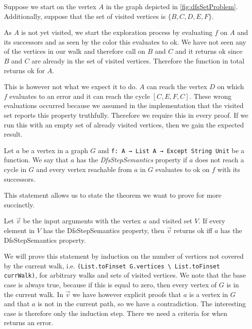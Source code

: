 \begin{example}
  Suppose we start \dfsstep on the vertex $A$ in the graph depicted in \cref{fig:dfsSetProblem}. Additionally, suppose that the set of visited vertices is $\{B,C,D,E,F\}$. 
  
  As $A$ is not yet visited, we start the exploration process by evaluating $f$ on $A$ and its successors and as seen by the color this evaluates to ok. We have not seen any of the vertices in our walk and therefore call \dfsstep on $B$ and $C$ and it returns ok since $B$ and $C$ are already in the set of visited vertices. Therefore the function in total returns ok for $A$.

  This is however not what we expect it to do. $A$ can reach the vertex $D$ on which $f$ evaluates to an error and it can reach the cycle $[C,E,F,C]$. These wrong evaluations occurred because we assumed in the implementation that the visited set reports this property truthfully. Therefore we require this in every proof. If we run this with an empty set of already visited vertices, then we gain the expected result.
\end{example}

\begin{definition}
  Let $a$ be a vertex in a graph $G$ and \lstinline|f: A → List A → Except String Unit| be a function. We say that $a$ has the \textit{DfsStepSemantics} property if $a$ does not reach a cycle in $G$ and every vertex reachable from $a$ in $G$ evaluates to ok on $f$ with its successors.
\end{definition}

This statement allows us to state the theorem we want to prove for \dfsstep more succinctly.

\begin{theorem}[\dfsstepsematics]\label{trm:dfsstepsematics}
  Let $\vec{v}$ be the input arguments with the vertex $a$ and visited set $V$. If every element in $V$ has the DfsStepSemantics property, then \dfsstep $\vec{v}$ returns ok iff $a$ has the DfsStepSemantics property.
\end{theorem}

\noindent We will prove this statement by induction on the number of vertices not covered by the current walk, i.e. \lstinline|(List.toFinset G.vertices \ List.toFinset currWalk)|, for arbitrary walks and sets of visited vertices. We note that the base case is always true, because if this is equal to zero, then every vertex of $G$ is in the current walk. In $\vec{v}$ we have however explicit proofs that $a$ is a vertex in $G$ and that $a$ is not in the current path, so we have a contradiction. The interesting case is therefore only the induction step. There we need a criteria for when \foldlexceptset returns an error.

